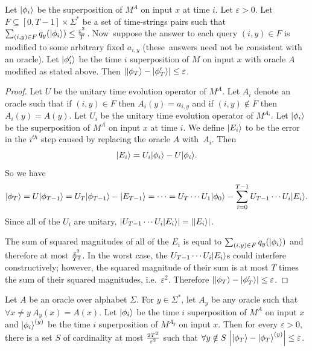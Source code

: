 \begin{theorem}
\label{flip.answers}
Let ${| \phi_i \rangle}$ be the superposition of $M^A$ on input $x$
at time $i$. Let $\varepsilon > 0$.
Let~\mbox{$F \subseteq [0,T-1] \times \Sigma^*$} be a set of time-strings
pairs such that $\sum_{(i,y) \in F} q_y ({| \phi_i \rangle}) \leq
{\varepsilon^2 \over T}$.  Now~suppose the answer to each query
$(i,y) \in F$ is modified to some arbitrary fixed $a_{i,y}$ (these~answers
need not be consistent with an oracle). Let ${| \phi '_i \rangle}$ be the
time $i$ superposition of $M$ on input $x$ with oracle $A$ modified
as stated above. Then ${\left| {| \phi_T \rangle} - {| \phi '_T \rangle} \right|} \leq \varepsilon$.
\end{theorem}

\begin{proof}
Let $U$ be the unitary time evolution operator of $M^A$.
Let $A_i$ denote an oracle such that if $(i,y) \in F$
then $A_i(y) = a_{i,y}$ and if $(i,y) \notin F$ then $A_i (y) = A(y)$.
Let $U_i$ be the unitary time evolution operator of $M^{A_i}$.
Let ${| \phi_i \rangle}$ be the superposition of $M^A$ on input $x$
at time $i$. We define ${| E_i \rangle}$ to be the error in the
$i^{th}$ step caused by replacing the oracle $A$ with~$A_i$. Then
\[{| E_i \rangle} = U_i {| \phi_{i} \rangle} - U {| \phi_{i} \rangle}.\]
So we have
\[{| \phi_T \rangle} = U {| \phi_{T-1} \rangle} = U_T {| \phi_{T-1} \rangle} - {| E_{T-1} \rangle}
= \cdots = U_T \cdots U_1 {| \phi_0 \rangle} - \sum_{i = 0}^{T-1} U_{T-1} \cdots
U_{i}{| E_i \rangle}.\]
Since all of the $U_i$ are unitary,
${\left| U_{T-1} \cdots U_{i}{| E_i \rangle} \right|} = {\left| {| E_i \rangle} \right|}$.

The sum of squared magnitudes of all of
the $E_i$ is equal to $\sum_{(i,y) \in F} q_y ({| \phi_i \rangle})$
and therefore at most ${\varepsilon^2 \over T^2}$.
In the worst case, the $U_{T-1} \cdots U_{i}{| E_i \rangle}$s
could interfere constructively; however, the squared magnitude
of their sum is at most $T$ times the sum
of their squared magnitudes, i.e.~$\varepsilon ^2$. Therefore
${\left| {| \phi_T \rangle} - {| \phi '_T \rangle} \right|} \leq \varepsilon$.
\end{proof}

\begin{corollary}
\label{change.oracles}
Let $A$ be an oracle over alphabet $\Sigma$. For $y \in \Sigma^*$,
let $A_y$ be any oracle such that $\forall x \neq y ~ A_y (x) = A(x)$.
Let ${| \phi_i \rangle}$ be the time $i$ superposition of $M^A$ on input
$x$ and ${| \phi_i \rangle}^{(y)}$ be the time $i$ superposition of $M^{A_y}$
on input $x$. Then for every $\varepsilon > 0$,
there is a set $S$ of cardinality at most
${2 T^2 \over \varepsilon^2}$ such that
$\forall y \notin S ~ {\left| {| \phi_T \rangle}-{| \phi_T \rangle}^{(y)} \right|} \leq \varepsilon$.
\end{corollary}

